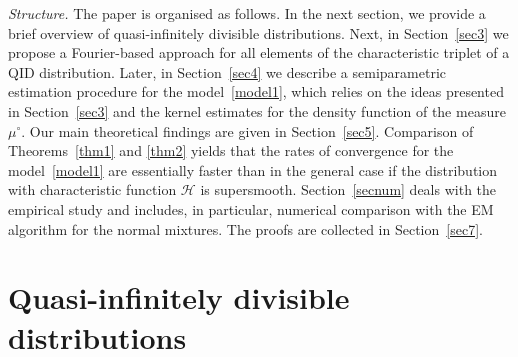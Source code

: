 \documentclass[a4paper,11pt]{article}
\theoremstyle{definition}
\newcommand{\1}{\mathbb{I}}
\theoremstyle{remark}
\begin{document}
\textit{Structure.} The paper is organised as follows. In the next section, we provide a brief overview of quasi-infinitely divisible distributions.  Next, in Section~\ref{sec3} we propose a Fourier-based approach for all elements of the characteristic triplet of a QID distribution.  Later, in Section~\ref{sec4}  we describe a semiparametric estimation procedure for the model~\eqref{model1}, which relies on the ideas presented in Section~\ref{sec3} and the kernel estimates for the density function of the measure \(\mu^\circ\).
 Our main theoretical findings are given in Section~\ref{sec5}. Comparison of Theorems~\ref{thm1} and \ref{thm2} yields that the rates  of convergence for the model~\eqref{model1} are essentially faster than in the general case if the distribution with characteristic function \(\mathcal{H}\) is supersmooth. 
Section~\ref{secnum} deals with the empirical study and includes, in particular, numerical comparison with the EM algorithm for the normal mixtures. The proofs are collected in Section~\ref{sec7}.

 
 \section{Quasi-infinitely divisible distributions}
\end{document}

